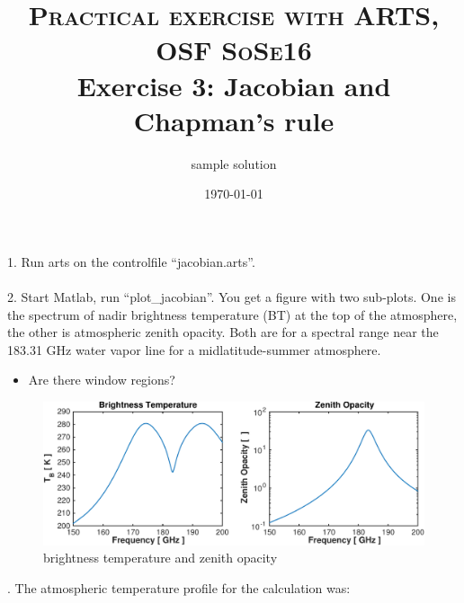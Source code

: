 \documentclass[paper=a4, fontsize=11pt]{scrartcl} %
\title{	
\normalfont \normalsize 
\textsc{Practical exercise with ARTS, OSF SoSe16} \\ [25pt] %
\huge Exercise 3: Jacobian and Chapman's rule \\ %
}
\author{sample solution}
\date{\normalsize\today}
\numberwithin{figure}{section}
\begin{document}
\maketitle

1. Run arts on the controlfile ``jacobian.arts''.\ \\
\ \\2. Start Matlab, run ``plot\_jacobian''. You get a figure with two sub-plots. 
One is the spectrum of nadir brightness temperature (BT) at the top of the atmosphere, the other is atmospheric zenith opacity. 
Both are for a spectral range near the 183.31 GHz water vapor line for a midlatitude-summer atmosphere.\ \\

\begin{itemize}
	\item Are there window regions?
\end{itemize}

\begin{figure}[h!]
\centering
 	\includegraphics[width=\textwidth]{plots/bt_op_part1.pdf}
 	\caption{brightness temperature and zenith opacity}
\end{figure}

. The atmospheric temperature profile for the calculation was: \ \\
\end{document}
